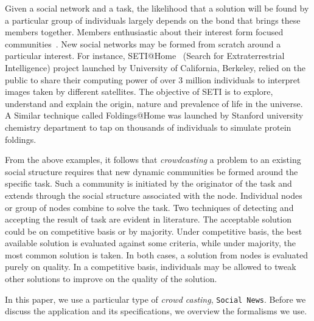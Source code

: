 Given a social network and a task, the likelihood that a solution will be found by a particular group of individuals
largely depends on the bond that brings these members together. Members enthusiastic about their interest form focused
communities~\cite{Kumar-Novak-Tomkins:06}. New social networks may be formed from scratch around a particular interest.
For instance, SETI@Home~\cite{Anderson:02} (Search for Extraterrestrial Intelligence) project launched by University of
California, Berkeley, relied on the public to share their computing power of over $3$ million individuals to interpret
images taken by different satellites. The objective of SETI is to explore, understand and explain the origin, nature and
prevalence of life in the universe. A Similar technique called Foldings@Home was launched by Stanford university
chemistry department to tap on thousands of individuals to simulate protein foldings.

From the above examples, it follows that \emph{crowdcasting} a problem to an existing social structure requires that new
dynamic communities be formed around the specific task. Such a community is initiated by the originator of the task and
extends through the social structure associated with the node. Individual nodes or group of nodes combine to solve the
task. Two techniques of detecting and accepting the result of task are evident in literature. The acceptable solution
could be on competitive basis or by majority. Under competitive basis, the best available solution is evaluated against
some criteria, while under majority, the most common solution is taken. In both cases, a solution from nodes is evaluated
purely on quality. In a competitive basis, individuals may be allowed to tweak other solutions to improve on the quality
of the solution.

In this paper, we use a particular type of \emph{crowd casting}, {\tt Social News}. Before we discuss the application and
its specifications, we overview the formalisms we use.



